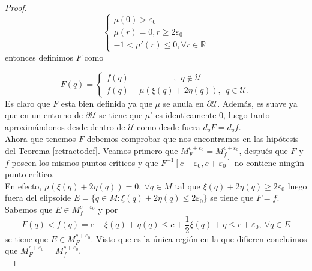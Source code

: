\begin{proof}
    \begin{equation*}
        \begin{cases}
        \mu(0)>\varepsilon_0\\
        \mu(r)=0, r\ge 2\varepsilon_0\\
        -1<\mu'(r)\le 0, \forall r\in \mathbb{R}
        \end{cases}
    \end{equation*}
    entonces definimos $F$ como
    
    \begin{equation*}
        F(q)=
        \begin{cases}
        f(q)~~~~~~~~~~~~~~~~~~~~~~~~,~~q\notin \mathcal{U}\\
        f(q)- \mu(\xi(q)+2\eta(q)),~~q\in \mathcal{U}.
        \end{cases}
    \end{equation*}
    Es claro que $F$ esta bien definida ya que $\mu$ se anula en $\partial\mathcal{U}$. Además, es suave ya que en un entorno de $\partial\mathcal{U}$ se tiene que $\mu'$ es identicamente $0$, luego tanto aproximándonos desde dentro de $\mathcal{U}$ como desde fuera $d_qF=d_qf$.\\
    

    Ahora que tenemos $F$ debemos comprobar que nos encontramos en las hipótesis del Teorema \ref{retractodef}. Veamos primero que $M_F^{c+\varepsilon_0}=M_f^{c+\varepsilon_0}$, después que $F$ y $f$ poseen los mismos puntos críticos y que $F^{-1}[c-\varepsilon_0,c+\varepsilon_0]$ no contiene ningún punto crítico.\\

    En efecto, $\mu(\xi(q)+2\eta(q))=0, ~\forall q\in M$ tal que $\xi(q)+2\eta(q)\ge 2\varepsilon_0$ luego fuera del elipsoide $E=\{q\in M:\xi(q)+2\eta(q)\le 2\varepsilon_0\}$ se tiene que $F=f$.\\
    
    Sabemos que $E\in M_f^{c+\varepsilon_0}$ y por
    \begin{equation*}
        F(q)<f(q)=c-\xi(q)+\eta(q)\le c+\frac{1}{2}\xi(q)+\eta\le c + \varepsilon_0, ~\forall q\in E
    \end{equation*}
    se tiene que $E\in M_F^{c+\varepsilon_0}$. Visto que es la única región en la que difieren concluimos que $M_F^{c+\varepsilon_0}=M_f^{c+\varepsilon_0}$.\\


\end{proof}
